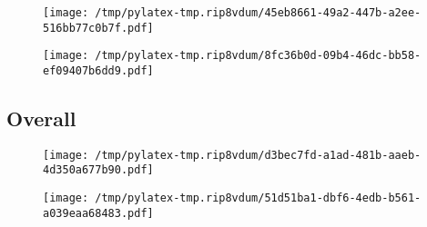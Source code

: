 \documentclass{article}%
\begin{document}
\begin{figure}[htbp]%
\centering%
\texttt{[image: /tmp/pylatex-tmp.rip8vdum/45eb8661-49a2-447b-a2ee-516bb77c0b7f.pdf]}%
\end{figure}

%


\begin{figure}[htbp]%
\centering%
\texttt{[image: /tmp/pylatex-tmp.rip8vdum/8fc36b0d-09b4-46dc-bb58-ef09407b6dd9.pdf]}%
\end{figure}

%
\newpage %
\subsection{Overall}%
\label{subsec:Overall}%


\begin{figure}[htbp]%
\centering%
\texttt{[image: /tmp/pylatex-tmp.rip8vdum/d3bec7fd-a1ad-481b-aaeb-4d350a677b90.pdf]}%
\end{figure}

%


\begin{figure}[htbp]%
\centering%
\texttt{[image: /tmp/pylatex-tmp.rip8vdum/51d51ba1-dbf6-4edb-b561-a039eaa68483.pdf]}%
\end{figure}

%
\end{document}
